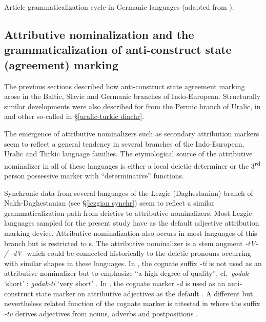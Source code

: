 {\begin{table}[t]
\caption[Article grammaticalization cycle in Germanic]{Article grammaticalization cycle in Germanic languages (adapted from \citealt[272]{riesler2006a}).}
\end{table}


\subsection[Attributive nominalization and anti\hyp{}construct state]{Attributive nominalization and the grammaticalization of anti\hyp{}construct state (agreement) marking}
The previous sections described how anti\hyp{}construct state agreement marking arose in the Baltic, Slavic and Germanic branches of Indo-European. Structurally similar developments were also described for  from the Permic branch of Uralic, in  and other so-called  in \S\ref{uralic-turkic diachr}. 

The emergence of attributive nominalizers such as secondary attribution markers seem to reflect a general tendency in several branches of the Indo-European, Uralic and Turkic language families. The etymological source of the attributive nominalizer in all of these languages is either a local deictic determiner or the 3\textsuperscript{rd} person possessive marker with “determinative” functions.

Synchronic data from several languages of the Lezgic (Daghestanian) branch of Nakh-Daghestanian (see \S\ref{lezgian synchr}) seem to reflect a similar grammaticalization path from deictics to attributive nominalizers. Most Lezgic languages sampled for the present study have  as the default adjective attribution marking device. Attributive nominalization also occurs in most languages of this branch but is restricted to s. The attributive nominalizer is a stem augment \textit{-tV- / -dV-} which could be connected historically to the deictic pronouns occurring with similar shapes in these languages. In , the cognate suffix \textit{-ti} is not used as an attributive nominalizer but to emphasize “a high degree of quality”, cf.~\textit{godak} ‘short’ : \textit{godak-ti} ‘very short’ \citep[267]{alekseev1994b}. In , the cognate marker \textit{-d} is used as an anti\hyp{}construct state marker on attributive adjectives as the default \citep[224]{alekseev1994a}. A different but nevertheless related function of the cognate marker is attested in  where the suffix \textit{-t̄u} derives adjectives from nouns, adverbs and postpositions \citep[318]{kibrik1994b}.

}
